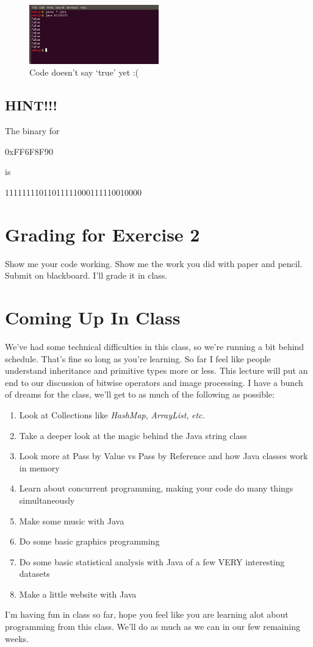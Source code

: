\documentclass[12pt]{article}
\begin{document}
\begin{figure}[h]
  \centering
    \includegraphics[width=0.5\textwidth]{Exercise2.png}
  \caption{Code doesn't say `true' yet :(}
\end{figure}

\subsection{HINT!!!}

The binary for 

\begin{center}
0xFF6F8F90
\end{center}

is

\begin{center}
11111111011011111000111110010000
\end{center}

\section{Grading for Exercise 2}

Show me your code working. Show me the work you did with paper and pencil. Submit on blackboard. I'll grade it in class.

\section{Coming Up In Class}

We've had some technical difficulties in this class, so we're running a bit behind schedule. That's fine so long as you're learning. So far I feel like people understand inheritance and primitive types more or less. This lecture will put an end to our discussion of bitwise operators and image processing. I have a bunch of dreams for the class, we'll get to as much of the following as possible:

\begin{enumerate}
\item Look at Collections like \textit{HashMap}, \textit{ArrayList}, \textit{etc.}
\item Take a deeper look at the magic behind the Java string class
\item Look more at Pass by Value vs Pass by Reference and how Java classes work in memory
\item Learn about concurrent programming, making your code do many things simultaneously
\item Make some music with Java
\item Do some basic graphics programming 
\item Do some basic statistical analysis with Java of a few VERY interesting datasets
\item Make a little website with Java
\end{enumerate}

I'm having fun in class so far, hope you feel like you are learning alot about programming from this class. We'll do as much as we can in our few remaining weeks.
\end{document}
